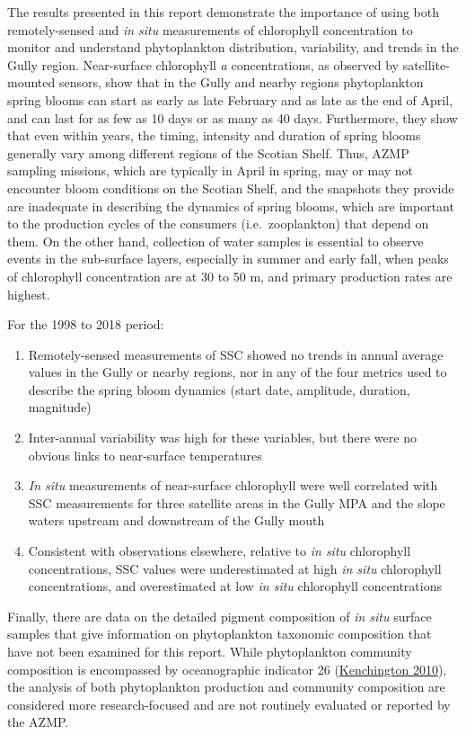 \documentclass[12pt]{article}\usepackage[]{graphicx}\usepackage[]{color}
\begin{document}
The results presented in this report demonstrate the importance of using both remotely-sensed and \emph{in situ} measurements of chlorophyll concentration to monitor and understand phytoplankton distribution, variability, and trends in the Gully region. Near-surface chlorophyll \emph{a} concentrations, as observed by satellite-mounted sensors, show that in the Gully and nearby regions phytoplankton spring blooms can start as early as late February and as late as the end of April, and can last for as few as 10 days or as many as 40 days. Furthermore, they show that even within years, the timing, intensity and duration of spring blooms generally vary among different regions of the Scotian Shelf. Thus, AZMP sampling missions, which are typically in April in spring, may or may not encounter bloom conditions on the Scotian Shelf, and the snapshots they provide are inadequate in describing the dynamics of spring blooms, which are important to the production cycles of the consumers (i.e.~zooplankton) that depend on them. On the other hand, collection of water samples is essential to observe events in the sub-surface layers, especially in summer and early fall, when peaks of chlorophyll concentration are at 30 to 50 m, and primary production rates are highest.

For the 1998 to 2018 period:
\begin{enumerate}
\def\labelenumi{\arabic{enumi}.}

\item
  Remotely-sensed measurements of SSC showed no trends in annual average values in the Gully or nearby regions, nor in any of the four metrics used to describe the spring bloom dynamics (start date, amplitude, duration, magnitude)
\item
  Inter-annual variability was high for these variables, but there were no obvious links to near-surface temperatures
\item
  \emph{In situ} measurements of near-surface chlorophyll were well correlated with SSC measurements for three satellite areas in the Gully MPA and the slope waters upstream and downstream of the Gully mouth
\item
  Consistent with observations elsewhere, relative to \emph{in situ} chlorophyll concentrations, SSC values were underestimated at high \emph{in situ} chlorophyll concentrations, and overestimated at low \emph{in situ} chlorophyll concentrations
\end{enumerate}
Finally, there are data on the detailed pigment composition of \emph{in situ} surface samples that give information on phytoplankton taxonomic composition that have not been examined for this report. While phytoplankton community composition is encompassed by oceanographic indicator 26 (\protect\hyperlink{ref-kenchington_2010}{Kenchington 2010}), the analysis of both phytoplankton production and community composition are considered more research-focused and are not routinely evaluated or reported by the AZMP.
\end{document}
